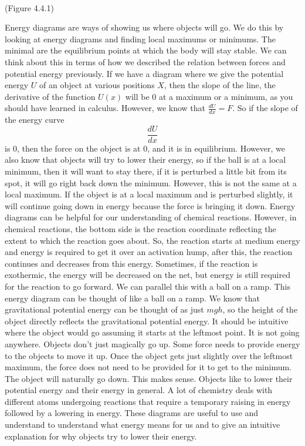 \
\newline
{}
\begin{center}
(Figure 4.4.1)
\end{center}
Energy diagrams are ways of showing us where objects will go. We do this by looking at energy diagrams and finding local maximums or minimums. The minimal are the equilibrium points at which the body will stay stable. We can think about this in terms of how we described the relation between forces and potential energy previously. If we have a diagram where we give the potential energy $U$ of an object at various positions $X$, then the slope of the line, the derivative of the function $U\left(x\right)$ will be 0 at a maximum or a minimum, as you should have learned in calculus. However, we know that $\frac{dU}{dx}=F$. So if the slope of the energy curve $$\frac{dU}{dx}$$ is 0, then the force on the object is at 0, and it is in equilibrium. However, we also know that objects will try to lower their energy, so if the ball is at a local minimum, then it will want to stay there, if it is perturbed a little bit from its spot, it will go right back down the minimum. However, this is not the same at a local maximum. If the object is at a local maximum and is perturbed slightly, it will continue going down in energy because the force is bringing it down. Energy diagrams can be helpful for our understanding of chemical reactions. However, in chemical reactions, the bottom side is the reaction coordinate reflecting the extent to which the reaction goes about. So, the reaction starts at medium energy and energy is required to get it over an activation hump, after this, the reaction continues and decreases from this energy. Sometimes, if the reaction is exothermic, the energy will be decreased on the net, but energy is still required for the reaction to go forward. We can parallel this with a ball on a ramp. This energy diagram can be thought of like a ball on a ramp. We know that gravitational potential energy can be thought of as just $mgh$, so the height of the object directly reflects the gravitational potential energy. It should be intuitive where the object would go assuming it starts at the leftmost point. It is not going anywhere. Objects don't just magically go up. Some force needs to provide energy to the objects to move it up. Once the object gets just slightly over the leftmost maximum, the force does not need to be provided for it to get to the minimum. The object will naturally go down. This makes sense. Objects like to lower their potential energy and their energy in general. A lot of chemistry deals with different atoms undergoing reactions that require a temporary raising in energy followed by a lowering in energy. These diagrams are useful to use and understand to understand what energy means for us and to give an intuitive explanation for why objects try to lower their energy. 